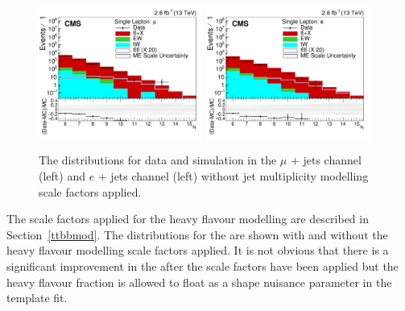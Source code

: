 \begin{figure}[ht!]
    \includegraphics[width=0.48\textwidth]{images/Run2/nJets_StackLogY_woAlphaS.pdf}
    \includegraphics[width=0.48\textwidth]{images/Run2/nJets_StackLogY_e_woAlphaS.pdf}
    \caption{The \njets distributions for data and simulation in the $\mu$ + jets channel (left) and $e$ + jets channel (left) without jet multiplicity modelling scale factors applied.}
    \label{fig:withoutAlpha}
\end{figure}

The scale factors applied for the heavy flavour modelling are described in Section~\ref{ttbbmod}. The distributions for the \nMtags are shown with and without the heavy flavour modelling scale factors applied. It is not obvious that there is a significant improvement in the \nMtags after the scale factors have been applied but the heavy flavour fraction is allowed to float as a shape nuisance parameter in the template fit.

